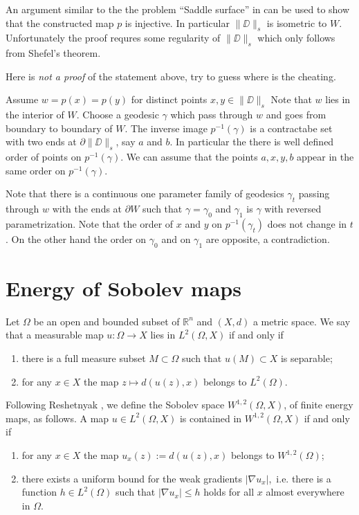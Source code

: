 \documentclass[a4paper,10pt]{amsart}
\begin{document}
 An argument similar to the the problem ``Saddle surface'' in \cite{petrunin-orthodox}
can be used to show that the constructed map $p$ 
is injective. 
In particular $\|\DD\|_s$ is isometric to $W$.
Unfortunately the proof requres some regularity of $\|\DD\|_s$ which only follows from Shefel's theorem. 

Here is \emph{not a proof} of the statement above, try to guess where is the cheating.

 Assume  $w=p(x)=p(y)$ for distinct points $x,y\in\|\DD\|_s$
Note that  $w$ lies in the interior of $W$.
Choose a geodesic $\gamma$ which pass through $w$ and goes 
from boundary to boundary of $W$.
The inverse image $p^{-1}(\gamma)$ is a contractabe set with two ends at $\partial\|\DD\|_s$, say $a$ and $b$.
In particular the there is well defined order of  points on $p^{-1}(\gamma)$.
We can assume that the points $a,x,y,b$ appear in the same order on $p^{-1}(\gamma)$. 

Note that there is a continuous one parameter family of geodesics $\gamma_t$ passing through $w$ with the ends at $\partial W$
such that $\gamma=\gamma_0$ and $\gamma_1$ is $\gamma$ with reversed parametrization.
Note that the order of $x$ and $y$ on $p^{-1}(\gamma_t)$ does not change in $t$.
On the other hand the order on $\gamma_0$ and on $\gamma_1$ are opposite, a contradiction.\qeds

\section{Energy of Sobolev maps}


Let $\Omega$ be an open and bounded subset of $\mathbb{R}^n$ and $(X,d)$ a metric space.
We say that a measurable map $u:\Omega\to X$ lies in 
$L^2(\Omega,X)$ if and only if
\begin{enumerate}
 \item there is a full measure subset $M\subset \Omega$ such that $u(M)\subset X$ is separable;
 \item for any $x\in X$ the map $z\mapsto d(u(z),x)$ belongs to $L^2(\Omega)$.
\end{enumerate}

Following Reshetnyak \cite{R}, we define the Sobolev space $W^{1,2}(\Omega,X)$, of finite energy maps, as follows. 
A map $u\in L^2(\Omega,X)$ is contained in $W^{1,2}(\Omega,X)$ if and only if

\begin{enumerate}
 \item for any $x\in X$ the map $u_x(z):=d(u(z),x)$ belongs to $W^{1,2}(\Omega)$;
 \item there exists a uniform bound for the weak gradients $|\nabla u_x|$,\ i.e. there is a function $h\in L^2(\Omega)$ 
 such that $|\nabla u_x|\leq h$ holds for all $x$ almost everywhere in $\Omega$. 
\end{enumerate}
\end{document}

